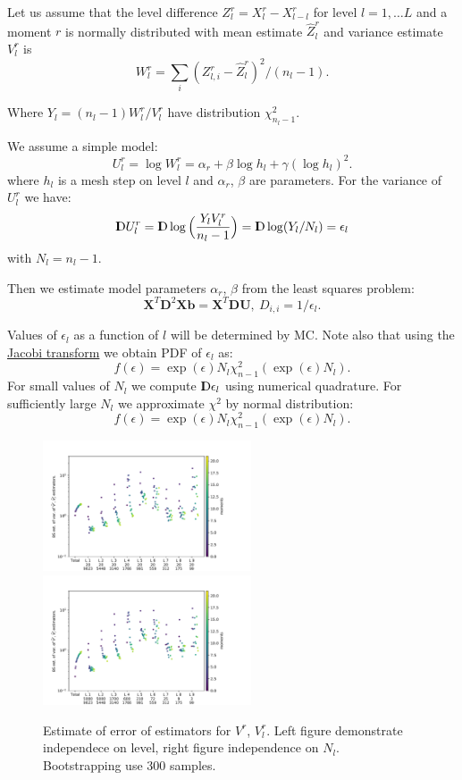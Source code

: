 \documentclass{article}
\def\vc#1{\mathbf{\boldsymbol{#1}}}     %
\def\tn#1{\boldsymbol{#1}}
\def \D{{{\rm I\kern-.3em D}}}
\begin{document}
Let us assume that the level difference $Z_l^r = X_l^r - X^r_{l-l}$ for level $l=1,\dots L$ and a moment $r$ is normally distributed 
with mean estimate $\hat{Z}_l^r$ and variance estimate $V_l^r$ is
$$
W_l^r = \sum_{i} (Z^r_{l,i} - \hat{Z}_l^r)^2 / (n_l - 1).
$$

Where $Y_l = (n_l -1)W_l^r/V_l^r$ have distribution $\chi^2_{n_l -1}$.

We assume a simple model:
$$
  U_l^r = \log W_l^r =  \alpha_r + \beta \log h_l + \gamma (\log h_l)^2.
$$
where $h_l$ is a mesh step on level $l$ and $\alpha_r$, $\beta$ are parameters. 
For the variance of $U_l^r$ we have:
$$
  \D U_l^r = \D \log \Big( \frac{Y_l V_l^r}{n_l - 1} \Big) = \D \log (Y_l/N_l) = \epsilon_l
$$
with $N_l = n_l - 1$.

Then we estimate model parameters $\alpha_r$, $\beta$ from the least squares problem:
$$
    \tn{X}^T \tn{D}^2 \tn{X} \vc{b} = \tn{X}^T \tn{D} \vc{U},
    \ D_{i,i} = 1/\epsilon_{l}.
$$

Values of $\epsilon_l$ as a function of $l$ will be determined by MC. Note also that using the \href{https://en.wikipedia.org/wiki/Probability_density_function#Dependent_variables_and_change_of_variables}{Jacobi transform} we obtain PDF of $\epsilon_l$ as:
$$
    f(\epsilon) = \exp(\epsilon)N_l\chi^2_{n-1}(\exp(\epsilon)N_l).
$$
For small values of $N_l$ we compute $\D \epsilon_l$ using numerical quadrature. For sufficiently large $N_l$ we approximate $\chi^2$ by normal distribution:
$$
    f(\epsilon) = \exp(\epsilon)N_l\chi^2_{n-1}(\exp(\epsilon)N_l).
$$

\begin{figure}
 \includegraphics[width=0.55\textwidth]{bs_var_var_20.pdf}
 \hspace{-0.1\textwidth}
 \includegraphics[width=0.55\textwidth]{bs_var_var_Nl.pdf}
 \caption{Estimate of error of estimators for $V^r$, $V_l^r$. Left figure demonstrate independece on level, right figure independence on $N_l$. Bootstrapping use 300 samples.}
 \label{fig:bs_var_var}
\end{figure}
\end{document}

